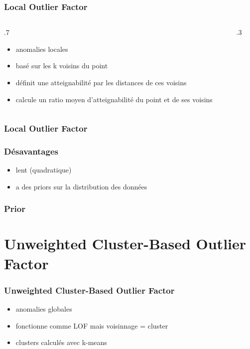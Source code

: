 \documentclass{formation}
\begin{document}
\begin{frame}
  \frametitle{Local Outlier Factor}

  \begin{columns}
    \begin{column}{.7\tw}
      \begin{itemize}[<+->]
      \item anomalies locales
      \item basé sur les k voisins du point
      \item définit une \og atteignabilité\fg{} par les distances de
        ces voisins
      \item calcule un ratio moyen d'atteignabilité du point et de ses
        voisins
      \end{itemize}
    \end{column}
    \begin{column}{.3\tw}
    \end{column}
  \end{columns}
\end{frame}

\begin{frame}
  \frametitle{Local Outlier Factor}

\end{frame}

\begin{frame}
  \frametitle{Désavantages}
  \begin{itemize}
  \item lent (quadratique)
  \item a des priors sur la distribution des données
  \end{itemize}
\end{frame}

\begin{frame}
  \frametitle{Prior}
\end{frame}

\section{Unweighted Cluster-Based Outlier Factor}

\begin{frame}
  \frametitle{Unweighted Cluster-Based Outlier Factor}

  \begin{itemize}[<+->]
  \item anomalies globales
  \item fonctionne comme LOF mais voisinnage = cluster
  \item clusters calculés avec k-means
  \end{itemize}
\end{frame}
\end{document}

